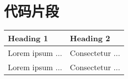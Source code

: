 \chapter{代码片段}


\begin{longtable}{|l|l|}
\hline
Heading 1 & Heading 2 \\
\hline\hline
\endhead
Lorem ipsum ... & Consectetur ... \\
\hline
Lorem ipsum ... & Consectetur ... \\
\hline

\end{longtable}

